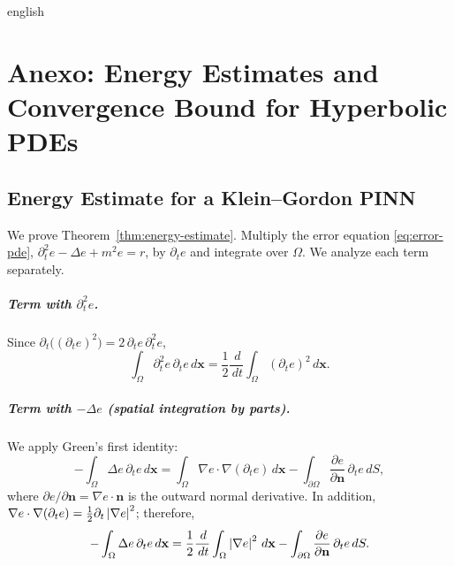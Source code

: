 \documentclass[0000.tex]{subfiles}
\begin{document}

\begin{hyphenrules}{english}

\chapter{Anexo: Energy Estimates and Convergence Bound for Hyperbolic PDEs}\label{app:derivations}

\section{Energy Estimate for a Klein--Gordon PINN}\label{app:energy}

We prove Theorem~\ref{thm:energy-estimate}. Multiply the error equation \eqref{eq:error-pde},
$\partial_t^2e-\Delta e+m^2e=r$, by $\partial_te$ and integrate over $\Omega$. We analyze each term
separately.

\paragraph{Term with $\partial_t^2e$.}
Since $\partial_t\big((\partial_te)^2\big)=2\,\partial_te\,\partial_t^2e$,
\[
  \int_\Omega\partial_t^2e\,\partial_te\,d\mathbf{x}=\frac12\frac{\,d}{\,d t}\int_\Omega(\partial_te)^2\,d\mathbf{x}.
\]

\paragraph{Term with $-\Delta e$ (spatial integration by parts).}
We apply Green's first identity:
\[
  -\int_\Omega\Delta e\,\partial_te\,d\mathbf{x}=\int_\Omega\nabla e\cdot\nabla(\partial_te)\,d\mathbf{x}
  -\int_{\partial\Omega}\frac{\partial e}{\partial\mathbf{n}}\,\partial_te\,d S,
\]
where $\partial e/\partial\mathbf{n}=\nabla e\cdot\mathbf{n}$ is the outward normal derivative. In addition,
$\nabla e\cdot\nabla(\partial_te)=\frac12\partial_t\left\lvert \nabla e \right\rvert^2$; therefore,
\begin{equation}
  -\int_\Omega\Delta e\,\partial_te\,d\mathbf{x}=\frac12\frac{\,d}{\,d t}\int_\Omega\left\lvert \nabla e \right\rvert^2\,d\mathbf{x}
  -\int_{\partial\Omega}\frac{\partial e}{\partial\mathbf{n}}\,\partial_te\,d S.
  \label{eq:app-lap}
\end{equation}


\end{hyphenrules}
\end{document}
